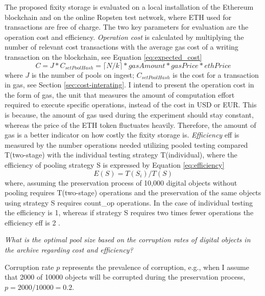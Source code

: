 The proposed fixity storage is evaluated on a local installation of the Ethereum blockchain and on the online Ropsten test network, where ETH used for transactions are free of charge.
The two key parameters for evaluation are the operation cost and efficiency. 
\textit{Operation cost} is calculated by multiplying the number of relevant cost transactions with the average gas cost of a writing transaction on the blockchain, see Equation \ref{eq:expected_cost}
\begin{equation}\label{eq:expected_cost}
    C = J * C_{setPoolHash} = \lceil N/k \rceil * gasAmount * gasPrice * ethPrice
\end{equation}
where $J$ is the number of pools on ingest; $C_{setPoolHash} $ is the cost for a transaction in gas, see Section \ref{sec:cost-interating}.
I intend to present the operation cost in the form of gas, the unit that measures the amount of computation effort required to execute specific operations, instead of the cost in USD or EUR. This is because, the amount of gas used during the experiment should stay constant, whereas the price of the ETH token fluctuates heavily. Therefore, the amount of gas is a better indicator on how costly the fixity storage is.
\textit{Efficiency} \acrshort{eff} is measured by the number operations needed utilizing pooled testing compared T(\acrshort{two-stage}) with the individual testing strategy T(\acrshort{individual}), where the efficiency of pooling strategy S is expressed by Equation \ref{eq:efficiency}
\begin{equation}\label{eq:efficiency}
    E(S) = T(S_{i})/T(S)
\end{equation}
where, assuming the preservation process of 10,000 digital objects without pooling requires T(\acrshort{two-stage}) operations and the preservation of the same objects using strategy S requires \acrshort{count_op} operations. In the case of individual testing the efficiency is 1, whereas if strategy S requires two times fewer operations the efficiency \acrshort{eff} is 2 \cite[4]{vzilinskas2021pooled}.

\textit{What is the optimal pool size based on the corruption rates of digital objects in the archive regarding cost and efficiency?}

Corruption rate $p$ represents the prevalence of corruption, e.g., when I assume that 2000 of 10000 objects will be corrupted during the preservation process, $p = 2000/10000 = 0.2$. 

